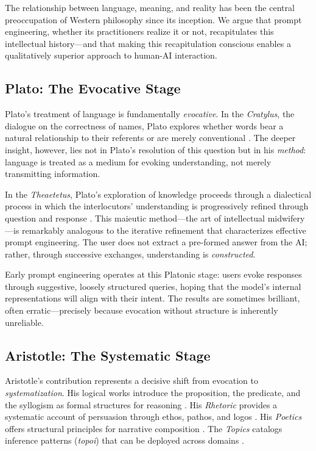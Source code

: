 \documentclass[11pt,a4paper]{article}
\begin{document}
The relationship between language, meaning, and reality has been the central preoccupation of Western philosophy since its inception. We argue that prompt engineering, whether its practitioners realize it or not, recapitulates this intellectual history---and that making this recapitulation conscious enables a qualitatively superior approach to human-AI interaction.

\subsection{Plato: The Evocative Stage}

Plato's treatment of language is fundamentally \emph{evocative}. In the \emph{Cratylus}, the dialogue on the correctness of names, Plato explores whether words bear a natural relationship to their referents or are merely conventional \citep{plato_cratylus}. The deeper insight, however, lies not in Plato's resolution of this question but in his \emph{method}: language is treated as a medium for evoking understanding, not merely transmitting information.

In the \emph{Theaetetus}, Plato's exploration of knowledge proceeds through a dialectical process in which the interlocutors' understanding is progressively refined through question and response \citep{plato_theaetetus}. This maieutic method---the art of intellectual midwifery---is remarkably analogous to the iterative refinement that characterizes effective prompt engineering. The user does not extract a pre-formed answer from the AI; rather, through successive exchanges, understanding is \emph{constructed}.

Early prompt engineering operates at this Platonic stage: users evoke responses through suggestive, loosely structured queries, hoping that the model's internal representations will align with their intent. The results are sometimes brilliant, often erratic---precisely because evocation without structure is inherently unreliable.

\subsection{Aristotle: The Systematic Stage}

Aristotle's contribution represents a decisive shift from evocation to \emph{systematization}. His logical works introduce the proposition, the predicate, and the syllogism as formal structures for reasoning \citep{aristotle_organon}. His \emph{Rhetoric} provides a systematic account of persuasion through ethos, pathos, and logos \citep{aristotle_rhetoric}. His \emph{Poetics} offers structural principles for narrative composition \citep{aristotle_poetics}. The \emph{Topics} catalogs inference patterns (\emph{topoi}) that can be deployed across domains \citep{aristotle_topics}.
\end{document}
